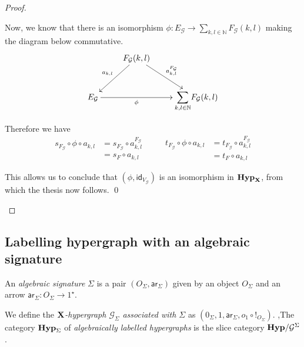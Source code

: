 \documentclass[runningheads,envcountsect]{llncs}
\def\X{\textbf {\textup{X}}}
\def\E{\textbf {\textup{E}}}
\newcommand{\catname}[1]{\textbf{\textup{#1}}}
\newcommand{\hyp}{\catname{Hyp}}
\newcommand{\hyps}{\catname{Hyp}_{\Sigma}}
\newcommand{\ari}{\mathsf{ar}}
\newcommand{\Sum}{\mathlarger{\sum}}
\newcommand{\id}[1]{\mathsf{id}_{#1}}
\begin{document}
\begin{proof}
\begin{itemize}
		Now, we know that there is an isomorphism $\phi \colon E_{\mathcal{G}} \to \sum_{k,l\in \mathbb{N}} F_{\mathcal{G}}(k,l)$ making the diagram below commutative.
	\[\xymatrix{& F_{\mathcal{G}}(k,l) \ar[dr]^{a^{F_\mathcal{{G}}}_{k,l}} \ar[dl]_{a_{k,l}} \\E_{\mathcal{G}} \ar[rr]_-{\phi} & & \Sum_{k,l\in \mathbb{N}} F_{\mathcal{G}}(k,l)}\]
	
	Therefore we have
	\[\begin{split}
	s_{F_{\mathcal{G}}} \circ \phi \circ a_{k,l}&=	s_{F_{\mathcal{G}}}  \circ a^{F_{\mathcal{G}}}_{k,l}	\\&= s_F\circ a_{k,l} \end{split} \qquad \begin{split}
	t_{F_{\mathcal{G}}} \circ \phi \circ a_{k,l}&=	t_{F_{\mathcal{G}}}  \circ a^{F_{\mathcal{G}}}_{k,l}	\\&= t_F\circ a_{k,l} \end{split}\]
	
	This allows us to conclude that $(\phi, \id{V_{\mathcal{G}}})$ is an isomorphism in $\hyp_\X$, from which the thesis now follows. \qed
	\end{itemize}
\end{proof}

\subsection{Labelling hypergraph with an algebraic signature}

\begin{definition}
An \emph{algebraic signature} $\Sigma$ is a pair $(O_\Sigma, \ari_\Sigma)$ given by an object $O_\Sigma$ and an arrow $\ari_\Sigma\colon O_\Sigma \to 1^\star$. 

We define the \emph{$\X$-hypergraph $\mathcal{G}_\Sigma$ associated with $\Sigma$} as $(0_\Sigma, 1, \ari_\Sigma, o_1\circ !_{O_\Sigma})$. ,The category $\hyps$ of \emph{algebraically labelled hypergraphs} is the slice category $\hyp/\mathcal{G}^\Sigma$.
\end{definition}
\end{document}
